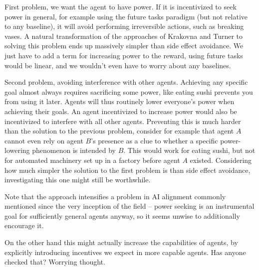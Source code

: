 \documentclass{article}
\begin{document}
	First problem, we want the agent to have power. If it is incentivized to seek power in general,
	for example using the future tasks paradigm (but not relative to any baseline), it will avoid
	performing irreversible actions, such as breaking vases. A natural transformation of the approaches
	of Krakovna and Turner to solving this problem ends up massively simpler than side effect avoidance.
	We just have to add a term for increasing power to the reward, using future tasks would be linear,
	and we wouldn't even have to worry about any baselines.

	Second problem, avoiding interference with other agents. Achieving any specific goal almost always
	requires sacrificing some power, like eating sushi prevents you from using it later. Agents will
	thus routinely lower everyone's power when achieving their goals. An agent incentivized to increase
	power would also be incentivized to interfere with all other agents. Preventing this is much harder
	than the solution to the previous problem, consider for example that agent $A$ cannot even rely
	on agent $B$'s presence as a clue to whether a specific power-lowering phenomenon is intended by $B$.
	This would work for eating sushi, but not for automated machinery set up in a factory before agent $A$
	existed. Considering how much simpler the solution to the first problem is than side effect avoidance,
	investigating this one might still be worthwhile.

	Note that the approach intensifies a problem in AI alignment commonly mentioned since the very
	inception of the field -- power seeking is an instrumental goal for sufficiently general
	agents anyway, so it seems unwise to additionally encourage it.

	On the other hand this might actually increase the capabilities of agents, by explicitly introducing
	incentives we expect in more capable agents.
	Has anyone checked that? Worrying thought.
\appendix
\end{document}
